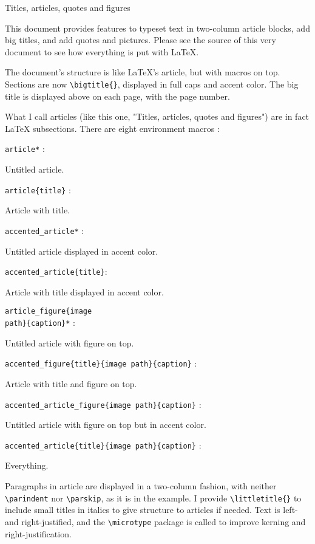 \documentclass[10pt]{article}
\begin{document}
\begin{article}{Titles, articles, quotes and figures}

\lettrine{T}{}his document provides features to typeset text in two-column article blocks, add big titles, and add quotes and pictures. Please see the source of this very document to see how everything is put with \LaTeX{}.


The document's structure is like \LaTeX's article, but with macros on top. Sections are now \texttt{\textbackslash bigtitle\{\}}, displayed in full caps and accent color. The big title is displayed above on each page, with the page number.

What I call articles (like this one, "Titles, articles, quotes and figures") are in fact \LaTeX{} subsections. There are eight environment macros :

\vskip 5pt \small \texttt{article*} : \normalsize

Untitled article.

\vskip 5pt \small \texttt{article\{title\}} : \normalsize

Article with title.

\vskip 5pt \small \texttt{accented\_article*} : \normalsize

Untitled article displayed in accent color.

\vskip 5pt \small \texttt{accented\_article\{title\}}: \normalsize

Article with title displayed in accent color.

\vskip 5pt \small \texttt{article\_figure\{image\\path\}\{caption\}*} : \normalsize

Untitled article with figure on top.

\vskip 5pt \small \texttt{accented\_figure\{title\}\{image path\}\{caption\}} : \normalsize

Article with title and figure on top.

\vskip 5pt \small \texttt{accented\_article\_figure\{image path\}\{caption\}} : \normalsize

Untitled article with figure on top but in accent color.

\vskip 5pt \small \texttt{accented\_article\{title\}\{image path\}\{caption\}} : \normalsize

Everything.


Paragraphs in article are displayed in a two-column fashion, with neither \texttt{\textbackslash parindent} nor \texttt{\textbackslash parskip}, as it is in the example. I provide \texttt{\textbackslash littletitle\{\}} to include small titles in italics to give structure to articles if needed. Text is left- and right-justified, and the \texttt{\textbackslash microtype} package is called to improve kerning and right-justification.


\end{article}
\end{document}
